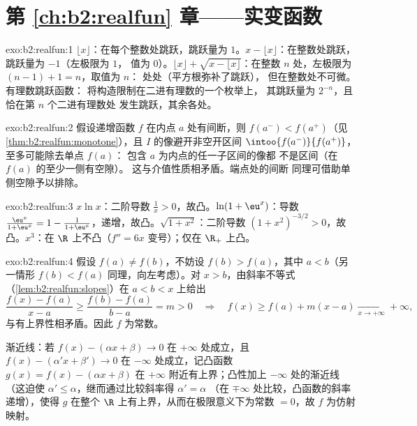 \section*{第 \ref{ch:b2:realfun} 章——实变函数}

\begin{solution}{exo:b2:realfun:1}
$\lfloor x\rfloor$：在每个整数处跳跃，跳跃量为 $1$。$x -
\lfloor x\rfloor$：在整数处跳跃，跳跃量为 $-1$（左极限为 $1$，
值为 $0$）。$\lfloor x\rfloor + \sqrt{x - \lfloor x\rfloor}$：在整数
$n$ 处，左极限为 $(n - 1) + 1 = n$，取值为 $n$：
处处\emph{}（平方根弥补了跳跃），
但在整数处不可微。有理数跳跃函数：
将构造限制在二进有理数的一个枚举上，
其跳跃量为 $2^{-n}$，且恰在第 $n$ 个二进有理数处
发生跳跃，其余各处。
\end{solution}

\begin{solution}{exo:b2:realfun:2}
假设递增函数 $f$ 在内点 $a$ 处有间断，则
$f(a^-) < f(a^+)$（见\cref{thm:b2:realfun:monotone}），且
$I$ 的像避开非空开区间
$\intoo{f(a^-)}{f(a^+)}$，至多可能除去单点 $f(a)$：
包含 $a$ 为内点的任一子区间的像都
不是区间（在 $f(a)$ 的至少一侧有空隙）。
这与介值性质相矛盾。端点处的间断
同理可借助单侧空隙予以排除。
\end{solution}

\begin{solution}{exo:b2:realfun:3}
$x\ln x$：二阶导数 $\frac1x > 0$，故凸。$\ln(1 +
\eu^x)$：导数 $\frac{\eu^x}{1 + \eu^x} = 1 - \frac{1}{1 +
\eu^x}$，递增，故凸。$\sqrt{1 + x^2}$：二阶导数
$(1 + x^2)^{-3/2} > 0$，故凸。$x^3$：在 $\R$ 上不凸（$f'' =
6x$ 变号）；仅在 $\R_+$ 上凸。
\end{solution}

\begin{solution}{exo:b2:realfun:4}
假设 $f(a) \neq f(b)$，不妨设 $f(b) > f(a)$，其中 $a < b$（另一情形
$f(b) < f(a)$ 同理，向左考虑）。对 $x > b$，由斜率不等式
（\cref{lem:b2:realfun:slopes}）在 $a < b < x$ 上给出
\[
\frac{f(x) - f(a)}{x - a} \geq \frac{f(b) - f(a)}{b - a} = m > 0
\quad\Longrightarrow\quad
f(x) \geq f(a) + m(x - a) \xrightarrow[x\to+\infty]{} +\infty,
\]
与有上界性相矛盾。因此 $f$ 为常数。

渐近线：若 $f(x) - (\alpha x + \beta) \to 0$ 在 $+\infty$ 处成立，且
$f(x) - (\alpha' x + \beta') \to 0$ 在 $-\infty$ 处成立，记凸函数
$g(x) = f(x) - (\alpha x + \beta)$ 在
$+\infty$ 附近有上界；凸性加上 $-\infty$ 处的渐近线（这迫使
$\alpha' \leq \alpha$，继而通过比较斜率得 $\alpha' = \alpha$
（在 $\mp\infty$ 处比较，凸函数的斜率递增），使得 $g$
在整个 $\R$ 上有上界，从而在极限意义下为常数 $= 0$，故 $f$
为仿射映射。
\end{solution}

